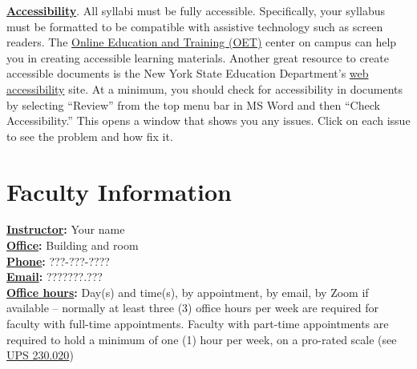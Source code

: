 \documentclass[12pt]{article}
\begin{document}
\vspace{1em}

\noindent\textbf{\underline{Accessibility}}. All syllabi must be fully accessible. Specifically, your syllabus must be formatted to be compatible with assistive technology such as screen readers. The \href{https://oet.fullerton.edu/}{Online Education and Training (OET)} center on campus can help you in creating accessible learning materials. Another great resource to create accessible documents is the New York State Education Department's \href{http://www.nysed.gov/webaccess}{web accessibility} site. At a minimum, you should check for accessibility in documents by selecting ``Review'' from the top menu bar in MS Word and then ``Check Accessibility.'' This opens a window that shows you any issues. Click on each issue to see the problem and how fix it.

\vspace{1em}

\maketitle


\section*{Faculty Information}
\noindent \textbf{\underline{Instructor}:} Your name 
\vspace{0.5em} \\
\noindent \textbf{\underline{Office}:} Building and room
\vspace{0.5em} \\
\noindent \textbf{\underline{Phone}:} ???-???-????
\vspace{0.5em} \\
\noindent \textbf{\underline{Email}:} ????\@???.???
\vspace{0.5em} \\ 
\noindent \textbf{\underline{Office hours}:} {\color{suggestionred}Day(s) and time(s), by appointment, by email, by Zoom if available} {\color{annotationblue}-- normally at least three (3) office hours per week are required for faculty with full-time appointments. Faculty with part-time appointments are required to hold a minimum of one (1) hour per week, on a pro-rated scale (see \href{https://www.fullerton.edu/senate/publications_policies_resolutions/ups/UPS\%20200/UPS\%20230.020.pdf}{UPS 230.020})}
\end{document}

